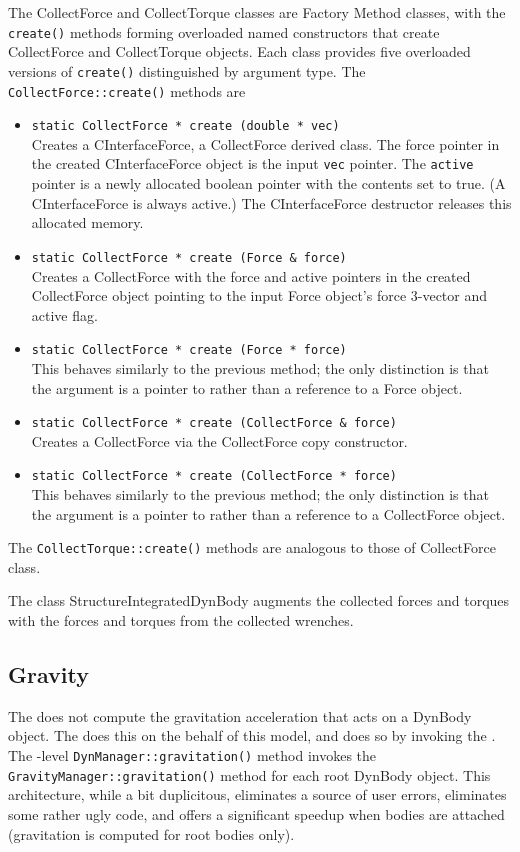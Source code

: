 The CollectForce and CollectTorque classes are Factory Method classes,
with the \verb+create()+ methods forming overloaded named constructors
that create CollectForce and CollectTorque objects.
Each class provides five overloaded versions of \verb+create()+ distinguished
by argument type. The \verb+CollectForce::create()+ methods are
\begin{itemize}
\item \verb+static CollectForce * create (double * vec)+\\
  Creates a CInterfaceForce, a CollectForce derived class. The
  force pointer in the created CInterfaceForce object is the input \verb+vec+
  pointer. The \verb+active+ pointer is a newly allocated boolean pointer
  with the contents set to true. (A CInterfaceForce is always active.)
  The CInterfaceForce destructor releases this allocated memory.
\item \verb+static CollectForce * create (Force & force)+\\
  Creates a CollectForce with the force and active pointers in the created
  CollectForce object pointing to the input Force object's force 3-vector and
  active flag.
\item \verb+static CollectForce * create (Force * force)+\\
  This behaves similarly to the previous method; the only distinction is that
  the argument is a pointer to rather than a reference to a Force object.
\item \verb+static CollectForce * create (CollectForce & force)+\\
  Creates a CollectForce via the CollectForce copy constructor.
\item \verb+static CollectForce * create (CollectForce * force)+\\
  This behaves similarly to the previous method; the only distinction is that
  the argument is a pointer to rather than a reference to a CollectForce object.
\end{itemize}
The \verb+CollectTorque::create()+ methods are analogous to those of CollectForce class.

The class StructureIntegratedDynBody augments the collected forces and torques
with the forces and torques from the collected wrenches.

\subsection{Gravity}\label{sec:detailed_gravity}
The \ModelDesc does not compute the gravitation acceleration that acts
on a DynBody object. The \DYNMANAGER does this on the behalf
of this model, and does so by invoking the \GRAVITY.
The \Sdefine-level \verb+DynManager::gravitation()+ method  invokes the
\verb+GravityManager::gravitation()+ method for each root DynBody object.
This architecture, while a bit duplicitous, eliminates a source of user errors,
eliminates some rather ugly \Sdefine code, and offers a significant speedup
when bodies are attached (gravitation is computed for root bodies only).

